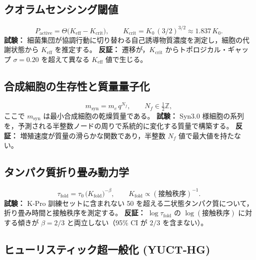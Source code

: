 \documentclass[11pt,a4paper]{article}
\begin{document}
	\subsection{クオラムセンシング閾値}
	
	\begin{equation}\label{eq:pred-qs}
		P_{\mathrm{active}} =
		\Theta\!\bigl(K_{\mathrm{eff}} - K_{\mathrm{crit}}\bigr),\qquad
		K_{\mathrm{crit}} = K_0\,(3/2)^{3/2} \approx 1.837\,K_0 .
	\end{equation}
	\textbf{試験：} 細菌集団が協調行動に切り替わる自己誘導物質濃度を測定し，細胞の代謝状態から \(K_{\mathrm{eff}}\) を推定する。
	\textbf{反証：} 遷移が，\(K_{\mathrm{crit}}\) からトポロジカル・ギャップ \(\sigma=0.20\) を超えて異なる \(K_{\mathrm{eff}}\) 値で生じる。
	
	\subsection{合成細胞の生存性と質量量子化}
	
	\begin{equation}\label{eq:pred-syn}
		m_{\mathrm{syn}} = m_e\,q^{N_f},\qquad N_f\in\tfrac12\mathbb{Z},
	\end{equation}
	ここで \(m_{\mathrm{syn}}\) は最小合成細胞の乾燥質量である。
	\textbf{試験：} Syn3.0 様細胞の系列を，予測される半整数ノードの周りで系統的に変化する質量で構築する。
	\textbf{反証：} 増殖速度が質量の滑らかな関数であり，半整数 \(N_f\) 値で最大値を持たない。
	
	\subsection{タンパク質折り畳み動力学}
	
	\begin{equation}\label{eq:pred-fold}
		\tau_{\mathrm{fold}} = \tau_0\,
		\bigl(K_{\mathrm{fold}}\bigr)^{-\beta},\qquad
		K_{\mathrm{fold}} \propto (\text{接触秩序})^{-1}.
	\end{equation}
	\textbf{試験：} K‑Pro 訓練セットに含まれない 50 を超える二状態タンパク質について，折り畳み時間と接触秩序を測定する。
	\textbf{反証：} \(\log\tau_{\mathrm{fold}}\) の \(\log(\text{接触秩序})\) に対する傾きが \(\beta=2/3\) と両立しない（95\% CI が \(2/3\) を含まない）。
	
	\subsection{ヒューリスティック超一般化 (YUCT‑HG)}
	
\end{document}
